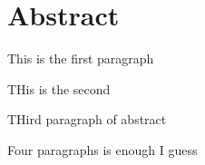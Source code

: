 \chapter*{Abstract}

This is the first paragraph

THis is the second 

THird paragraph of abstract

Four paragraphs is enough I guess 
